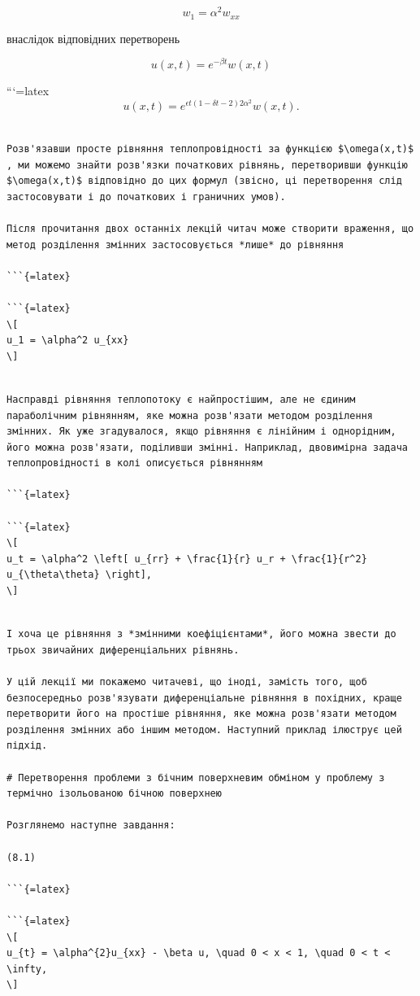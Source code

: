\documentclass[
  ukrainian,
]{article}
\begin{document}
\[
w_1 = \alpha^2 w_{xx}
\]

внаслідок відповідних перетворень

\[
u(x, t) = e^{-\beta t} w(x, t)
\]

```{=latex}
\[
u(x, t) = e^{\epsilon t (1 - \delta t - 2) 2\alpha^2} w(x, t).
\]

\begin{verbatim}

Розв'язавши просте рівняння теплопровідності за функцією $\omega(x,t)$ , ми можемо знайти розв'язки початкових рівнянь, перетворивши функцію $\omega(x,t)$ відповідно до цих формул (звісно, ці перетворення слід застосовувати і до початкових і граничних умов).

Після прочитання двох останніх лекцій читач може створити враження, що метод розділення змінних застосовується *лише* до рівняння

```{=latex}

```{=latex}
\[
u_1 = \alpha^2 u_{xx}
\]
\end{verbatim}

\begin{verbatim}

Насправді рівняння теплопотоку є найпростішим, але не єдиним параболічним рівнянням, яке можна розв'язати методом розділення змінних. Як уже згадувалося, якщо рівняння є лінійним і однорідним, його можна розв'язати, поділивши змінні. Наприклад, двовимірна задача теплопровідності в колі описується рівнянням

```{=latex}

```{=latex}
\[
u_t = \alpha^2 \left[ u_{rr} + \frac{1}{r} u_r + \frac{1}{r^2} u_{\theta\theta} \right],
\]
\end{verbatim}

\begin{verbatim}

І хоча це рівняння з *змінними коефіцієнтами*, його можна звести до трьох звичайних диференціальних рівнянь.

У цій лекції ми покажемо читачеві, що іноді, замість того, щоб безпосередньо розв'язувати диференціальне рівняння в похідних, краще перетворити його на простіше рівняння, яке можна розв'язати методом розділення змінних або іншим методом. Наступний приклад ілюструє цей підхід.

# Перетворення проблеми з бічним поверхневим обміном у проблему з термічно ізольованою бічною поверхнею

Розглянемо наступне завдання:

(8.1)

```{=latex}

```{=latex}
\[
u_{t} = \alpha^{2}u_{xx} - \beta u, \quad 0 < x < 1, \quad 0 < t < \infty,
\]
\end{verbatim}
\end{document}
